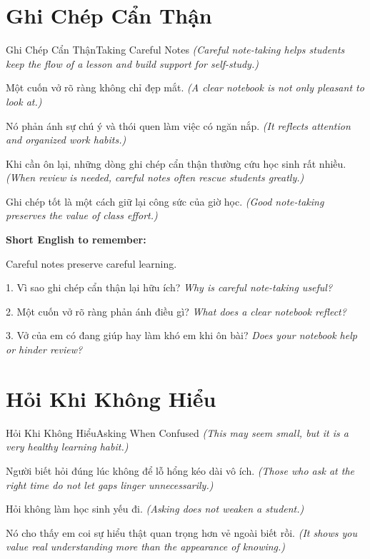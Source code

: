 \section{Ghi Chép Cẩn Thận}
\begin{truyen}{Ghi Chép Cẩn Thận}{Taking Careful Notes}
\textit{(Careful note-taking helps students keep the flow of a lesson and build support for self-study.)}

Một cuốn vở rõ ràng không chỉ đẹp mắt.
\textit{(A clear notebook is not only pleasant to look at.)}

Nó phản ánh sự chú ý và thói quen làm việc có ngăn nắp.
\textit{(It reflects attention and organized work habits.)}

Khi cần ôn lại, những dòng ghi chép cẩn thận thường cứu học sinh rất nhiều.
\textit{(When review is needed, careful notes often rescue students greatly.)}
\end{truyen}

\begin{baihoc}
Ghi chép tốt là một cách giữ lại công sức của giờ học.
\textit{(Good note-taking preserves the value of class effort.)}
\end{baihoc}

\begin{ghinhoanh}
\textbf{Short English to remember:}

Careful notes preserve careful learning.

\end{ghinhoanh}

\begin{tuhocnhanh}
1. Vì sao ghi chép cẩn thận lại hữu ích? \textit{Why is careful note-taking useful?}

2. Một cuốn vở rõ ràng phản ánh điều gì? \textit{What does a clear notebook reflect?}

3. Vở của em có đang giúp hay làm khó em khi ôn bài? \textit{Does your notebook help or hinder review?}
\end{tuhocnhanh}
\ngancach

\section{Hỏi Khi Không Hiểu}
\begin{truyen}{Hỏi Khi Không Hiểu}{Asking When Confused}
\textit{(This may seem small, but it is a very healthy learning habit.)}

Người biết hỏi đúng lúc không để lỗ hổng kéo dài vô ích.
\textit{(Those who ask at the right time do not let gaps linger unnecessarily.)}

Hỏi không làm học sinh yếu đi.
\textit{(Asking does not weaken a student.)}

Nó cho thấy em coi sự hiểu thật quan trọng hơn vẻ ngoài biết rồi.
\textit{(It shows you value real understanding more than the appearance of knowing.)}
\end{truyen}

